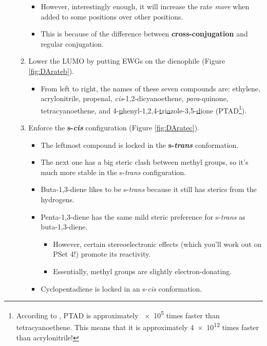 \documentclass[../notes.tex]{subfiles}
\begin{document}
\begin{itemize}
\begin{enumerate}
\begin{itemize}
            \item However, interestingly enough, it will increase the rate \emph{more} when added to some positions over other positions.
            \item This is because of the difference between \textbf{cross-conjugation} and regular conjugation.
        \end{itemize}
        \item Lower the LUMO by putting EWGs on the dienophile (Figure \ref{fig:DArateb}).
        \begin{itemize}
            \item From left to right, the names of these seven compounds are: ethylene, acrylonitrile, propenal, \emph{cis}-1,2-dicyanoethene, \emph{para}-quinone, tetracyanoethene, and 4-\underline{p}henyl-1,2,4-\underline{t}ri\underline{a}zole-3,5-\underline{d}ione (PTAD\footnote{According to \textcite{bib:PTAD}, PTAD is approximately \num{e5} times faster than tetracyanoethene. This means that it is approximately \num{4e12} times faster than acrylonitrile!}).
        \end{itemize}
        \item Enforce the \textbf{s-\emph{cis}} configuration (Figure \ref{fig:DAratec}).
        \begin{itemize}
            \item The leftmost compound is locked in the \textbf{s-\emph{trans}} conformation.
            \item The next one has a big steric clash between methyl groups, so it's much more stable in the s-\emph{trans} configuration.
            \item Buta-1,3-diene likes to be s-\emph{trans} because it still has sterics from the hydrogens.
            \item Penta-1,3-diene has the same mild steric preference for s-\emph{trans} as buta-1,3-diene.
            \begin{itemize}
                \item However, certain stereoelectronic effects (which you'll work out on PSet 4!) promote its reactivity.
                \item Essentially, methyl groups are slightly electron-donating.
            \end{itemize}
            \item Cyclopentadiene is locked in an s-\emph{cis} conformation.
        \end{itemize}
    \end{enumerate}

\end{itemize}
\end{document}
